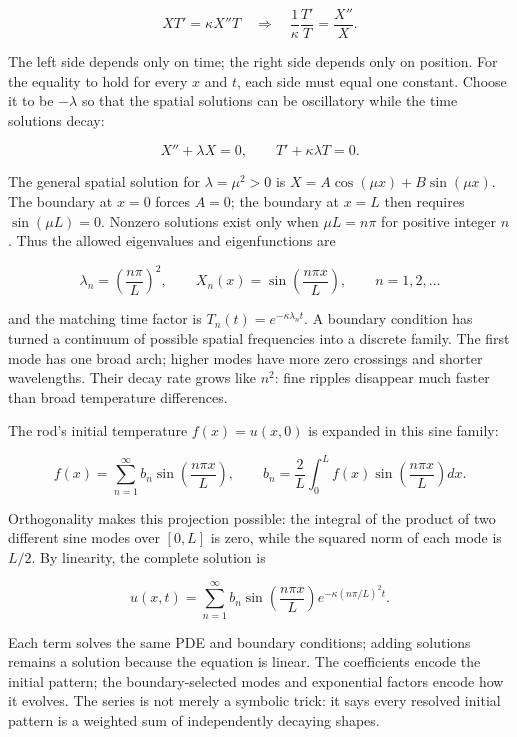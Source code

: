 \[
XT'=\kappa X''T
\quad\Longrightarrow\quad
\frac{1}{\kappa}\frac{T'}{T}=\frac{X''}{X}.
\]

The left side depends only on time; the right side depends only on position. For the equality to hold for every \(x\) and \(t\), each side must equal one constant. Choose it to be \(-\lambda\) so that the spatial solutions can be oscillatory while the time solutions decay:

\[
X''+\lambda X=0,\qquad T'+\kappa\lambda T=0.
\]

The general spatial solution for \(\lambda=\mu^2>0\) is \(X=A\cos(\mu x)+B\sin(\mu x)\). The boundary at \(x=0\) forces \(A=0\); the boundary at \(x=L\) then requires \(\sin(\mu L)=0\). Nonzero solutions exist only when \(\mu L=n\pi\) for positive integer \(n\). Thus the allowed eigenvalues and eigenfunctions are

\[
\lambda_n=\left(\frac{n\pi}{L}\right)^2,
\qquad
X_n(x)=\sin\left(\frac{n\pi x}{L}\right),
\qquad n=1,2,\ldots
\]

and the matching time factor is \(T_n(t)=e^{-\kappa\lambda_nt}\). A boundary condition has turned a continuum of possible spatial frequencies into a discrete family. The first mode has one broad arch; higher modes have more zero crossings and shorter wavelengths. Their decay rate grows like \(n^2\): fine ripples disappear much faster than broad temperature differences.

The rod's initial temperature \(f(x)=u(x,0)\) is expanded in this sine family:

\[
f(x)=\sum_{n=1}^{\infty}b_n\sin\left(\frac{n\pi x}{L}\right),
\qquad
b_n=\frac{2}{L}\int_0^L f(x)\sin\left(\frac{n\pi x}{L}\right)dx.
\]

Orthogonality makes this projection possible: the integral of the product of two different sine modes over \([0,L]\) is zero, while the squared norm of each mode is \(L/2\). By linearity, the complete solution is

\[
u(x,t)=\sum_{n=1}^{\infty}b_n\sin\left(\frac{n\pi x}{L}\right)e^{-\kappa(n\pi/L)^2t}.
\]

Each term solves the same PDE and boundary conditions; adding solutions remains a solution because the equation is linear. The coefficients encode the initial pattern; the boundary-selected modes and exponential factors encode how it evolves. The series is not merely a symbolic trick: it says every resolved initial pattern is a weighted sum of independently decaying shapes.

